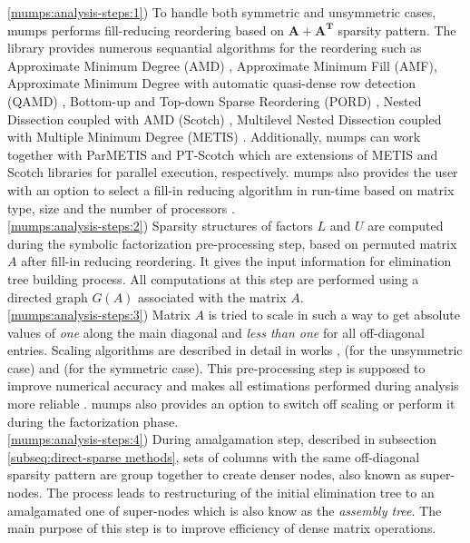 \ref{mumps:analysis-steps:1}) To handle both symmetric and unsymmetric cases, \gls{mumps} performs fill-reducing reordering based on $\boldsymbol{A} + \boldsymbol{A^T}$ sparsity pattern. The library provides numerous sequantial algorithms for the reordering such as Approximate Minimum Degree (AMD) \cite{reordering:AMD}, Approximate Minimum Fill (AMF), Approximate Minimum Degree with automatic quasi-dense row detection (QAMD) \cite{reordering:QAMD}, Bottom-up and Top-down Sparse Reordering (PORD) \cite{reordering:PORD}, Nested Dissection coupled with AMD (Scotch) \cite{reordering:SCOTCH}, Multilevel Nested Dissection coupled with Multiple Minimum Degree (METIS) \cite{reordering:METIS}. Additionally, \gls{mumps} can work together with ParMETIS and PT-Scotch which are extensions of METIS and Scotch libraries for parallel execution, respectively. \gls{mumps} also provides the user with an option to select a fill-in reducing algorithm in run-time based on matrix type, size and the number of processors \cite{mumps-manual}.\\


\ref{mumps:analysis-steps:2}) Sparsity structures of factors $L$ and $U$ are computed during the symbolic factorization pre-processing step, based on permuted matrix $A$ after fill-in reducing reordering. It gives the input information for elimination tree building process.  All computations at this step are performed using a directed graph $G(A)$ associated with the matrix $A$.\\


\ref{mumps:analysis-steps:3}) Matrix $A$ is tried to scale in such a way to get absolute values of \textit{one} along the main diagonal and \textit{less than one} for all off-diagonal entries. Scaling algorithms are described in detail in works \cite{mm:scaling:duff1999design}, \cite{mm:scaling:duff2001algorithms} (for the unsymmetric case) and \cite{mm:scaling:duff2005strategies} (for the symmetric case). This pre-processing step is supposed to improve numerical accuracy and makes all estimations performed during analysis more reliable \cite{mumps-manual}. \gls{mumps} also provides an option to switch off scaling or perform it during the factorization phase.\\



\ref{mumps:analysis-steps:4}) During amalgamation step, described in subsection \ref{subseq:direct-sparse methods}, sets of columns with the same off-diagonal sparsity pattern are group together to create denser nodes, also known as super-nodes. The process leads to restructuring of the initial elimination tree to an amalgamated one of super-nodes which is also know as the \textit{assembly tree}. The main purpose of this step is to improve efficiency of dense matrix operations.\\



